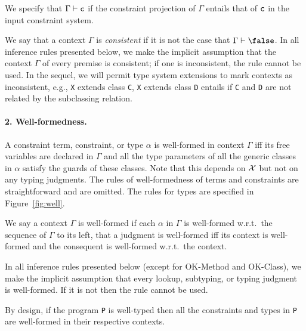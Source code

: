 We specify that $\Gamma\vdash{\tt c}$ if the constraint projection of $\Gamma$ entails that of $\tt c$ in the input constraint system. %

We say that a context $\Gamma$ is {\em consistent} if it is not the case that $\Gamma\vdash\false$.
In all inference rules presented below, we make the implicit assumption that the context $\Gamma$ of every premise is consistent; if one is inconsistent, the rule cannot be used. In the sequel, we will permit type system extensions to mark contexts as inconsistent, e.g., {\tt X} extends class {\tt C}, {\tt X} extends class {\tt D} entails \false{} if {\tt C} and {\tt D} are not related by the subclassing relation.


\paragraph{2. Well-formedness.} A constraint term, constraint, or type $\alpha$ is well-formed in context $\Gamma$ iff its free variables are declared in $\Gamma$ and all the type parameters of all the generic classes in $\alpha$ satisfy the guards of these classes. Note that this depends on $\cal X$ but not on any typing judgments. The rules of well-formedness of terms and constraints are straightforward and are omitted. The rules for types are specified in Figure~\ref{fig:well}. 

We say a context $\Gamma$ is well-formed if each $\alpha$ in $\Gamma$ is well-formed w.r.t.\ the sequence of $\Gamma$ to its left, that a judgment is well-formed iff its context is well-formed and the consequent is well-formed w.r.t.\ the context.

In all inference rules presented below (except for {\sc OK-Method} and {\sc OK-Class}), we make the implicit assumption that every lookup, subtyping, or typing judgment is well-formed. If it is not then the rule cannot be used.

By design, if the program {\tt P} is well-typed then all the constraints and types in {\tt P} are well-formed in their respective contexts.


